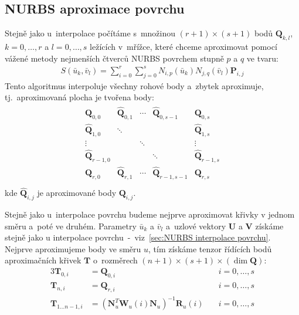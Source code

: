 \subsection{NURBS aproximace povrchu\label{section:aproximace povrchu}}
Stejně jako u~interpolace počítáme s~množinou $(r + 1)\times(s + 1)$ bodů
$\bm{Q}_{k,l}$, $k=0,\ldots, r$ a $l = 0, \ldots, s$ ležících v~mřížce, které chceme aproximovat
pomocí vážené metody nejmenších čtverců NURBS povrchem stupně $p$ a $q$ ve
tvaru:
\begin{align}
    S(\bar{u}_k, \bar{v}_l) = \sum_{i=0}^{r}\sum_{j=0}^{s}N_{i,p}(\bar{u}_k)N_{j,q}(\bar{v}_l)\bm{P}_{i,j}
\end{align}
Tento algoritmus interpoluje všechny rohové body a~zbytek aproximuje, tj.~aproximovaná plocha je tvořena body:
\begin{align}
    \begin{matrix}
        \bm{Q}_{0, 0}         & \hat{\bm{Q}}_{0, 1} & \cdots & \hat{\bm{Q}}_{0, s-1}   & \bm{Q}_{0, s}         \\
        \hat{\bm{Q}}_{1, 0}   & \ddots              &        &                         & \hat{\bm{Q}}_{1, s}   \\
        \vdots                &                     & \ddots &                         & \vdots                \\
        \hat{\bm{Q}}_{r-1, 0} &                     &        & \ddots                  & \hat{\bm{Q}}_{r-1, s} \\
        \bm{Q}_{r, 0}         & \hat{\bm{Q}}_{r, 1} & \cdots & \hat{\bm{Q}}_{r-1, s-1} & \bm{Q}_{r,s}          \\
    \end{matrix}
\end{align}
kde $\hat{\bm{Q}}_{i,j}$ je aproximované body $\bm{Q}_{i,j}$.\par
Stejně jako u~interpolace povrchu budeme nejprve aproximovat křivky
v jednom směru a~poté ve druhém. Parametry $\bar{u}_k$ a $\bar{v}_l$ a~uzlové
vektory $\bm{U}$ a $\bm{V}$ získáme stejně jako
u interpolace povrchu~-~viz~\ref{sec:NURBS interpolace povrchu}.
Nejprve aproximujeme body ve směru $u$, tím získáme tenzor řídících
bodů aproximačních křivek $\bm{T}$ o~rozměrech $(n + 1) \times (s + 1) \times (\dim{\bm{Q}})$:
\begin{alignat}{3}
    \bm{T}_{0, i}              & = \bm{Q}_{0, i}                                   & \quad i = 0, \ldots, s \\
    \bm{T}_{n, i}              & = \bm{Q}_{r, i}                                   & \quad i = 0, \ldots, s \\
    \bm{T}_{1 \ldots n - 1, i} & = (\bm{N}_u^T\bm{W}_u(i)\bm{N}_u)^{-1}\bm{R}_u(i) & \quad i = 0, \ldots, s
\end{alignat}
